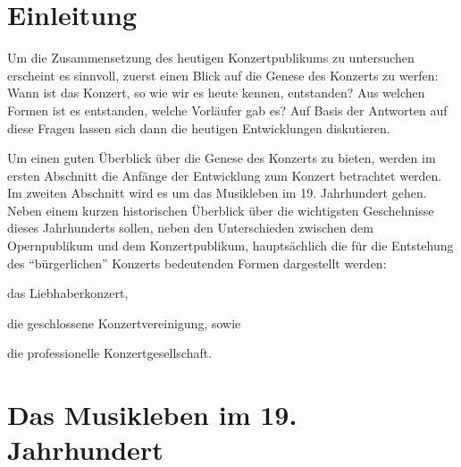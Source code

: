\documentclass[a4paper, german, oneside]{scrbook}
\begin{document}
\begingroup
\renewcommand{\cleardoublepage}{}
\renewcommand{\clearpage}{}

\chapter{Einleitung}
Um die Zusammensetzung des heutigen Konzertpublikums zu untersuchen erscheint es sinnvoll, zuerst einen Blick auf die Genese des Konzerts zu werfen: Wann ist das Konzert, so wie wir es heute kennen, entstanden? Aus welchen Formen ist es entstanden, welche Vorläufer gab es? Auf Basis der Antworten auf diese Fragen lassen sich dann die heutigen Entwicklungen diskutieren.

Um einen guten Überblick über die Genese des Konzerts zu bieten, werden im ersten Abschnitt die Anfänge der Entwicklung zum Konzert betrachtet werden. Im zweiten Abschnitt wird es um das Musikleben im 19. Jahrhundert gehen. Neben einem kurzen historischen Überblick über die wichtigsten Geschehnisse dieses Jahrhunderts sollen, neben den Unterschieden zwischen dem Opernpublikum und dem Konzertpublikum, hauptsächlich die für die Entstehung des \enquote{bürgerlichen} Konzerts bedeutenden Formen dargestellt werden: 
\begin{inparaenum}[(1)]
	\item das Liebhaberkonzert, 
	\item die geschlossene Konzertvereinigung, sowie 
	\item die professionelle Konzertgesellschaft.
\end{inparaenum}






\endgroup

\chapter{Das Musikleben im 19. Jahrhundert}
\label{19jh}
\end{document}

